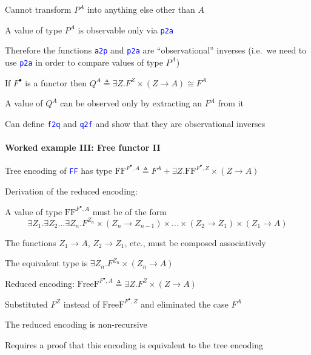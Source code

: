 Cannot transform $P^{A}$ into anything else other than $A$

A value of type $P^{A}$ is observable only via \texttt{\textcolor{blue}{\footnotesize{}p2a}} 

Therefore the functions \texttt{\textcolor{blue}{\footnotesize{}a2p}}
and \texttt{\textcolor{blue}{\footnotesize{}p2a}} are \textsf{``}observational\textsf{''}
inverses (i.e.~we need to use \texttt{\textcolor{blue}{\footnotesize{}p2a}}
in order to compare values of type $P^{A}$)

If $F^{\bullet}$ is a functor then $Q^{A}\triangleq\exists Z.F^{Z}\times\left(Z\rightarrow A\right)\cong F^{A}$

A value of $Q^{A}$ can be observed only by extracting an $F^{A}$
from it

Can define \texttt{\textcolor{blue}{\footnotesize{}f2q}} and \texttt{\textcolor{blue}{\footnotesize{}q2f}}
and show that they are observational inverses


\paragraph{Worked example III: Free functor II}

Tree encoding of \texttt{\textcolor{blue}{\footnotesize{}FF}} has
type $\text{FF}^{F^{\bullet},A}\triangleq F^{A}+\exists Z.\text{FF}^{F^{\bullet},Z}\times\left(Z\rightarrow A\right)$

Derivation of the reduced encoding:

A value of type $\text{FF}^{F^{\bullet},A}$ must be of the form {\footnotesize{}
\[
\exists Z_{1}.\exists Z_{2}...\exists Z_{n}.F^{Z_{n}}\times\left(Z_{n}\rightarrow Z_{n-1}\right)\times...\times\left(Z_{2}\rightarrow Z_{1}\right)\times\left(Z_{1}\rightarrow A\right)
\]
}{\footnotesize\par}

The functions $Z_{1}\rightarrow A$, $Z_{2}\rightarrow Z_{1}$, etc.,
must be composed associatively

The equivalent type is $\exists Z_{n}.F^{Z_{n}}\times\left(Z_{n}\rightarrow A\right)$

Reduced encoding: $\text{FreeF}^{F^{\bullet},A}\triangleq\exists Z.F^{Z}\times\left(Z\rightarrow A\right)$

Substituted $F^{Z}$ instead of $\text{FreeF}^{F^{\bullet},Z}$ and
eliminated the case $F^{A}$

The reduced encoding is non-recursive

Requires a proof that this encoding is equivalent to the tree encoding

